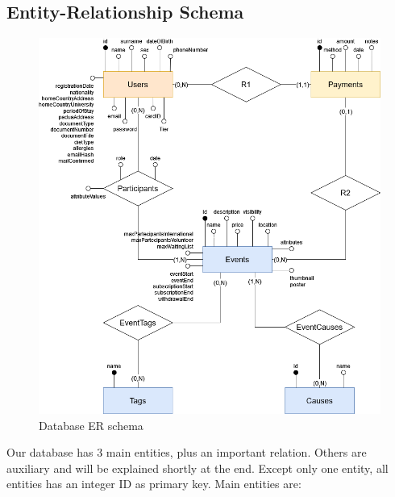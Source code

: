 \subsection{Entity-Relationship Schema}
\begin{figure}[h!]
    \centering
    \includegraphics[width=1\textwidth]{images/ERSchema.png}
    \caption{Database ER schema}
    \label{fig:er_schema}
\end{figure}
Our database has 3 main entities, plus an important relation. Others are auxiliary
and will be explained shortly at the end. Except only one entity, all entities has an integer ID
as primary key. Main entities are:
